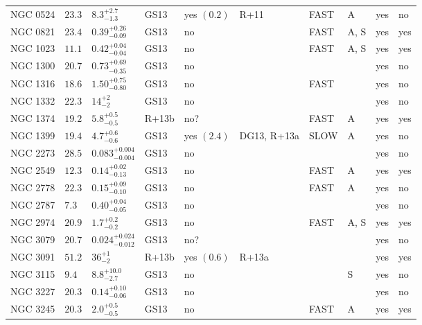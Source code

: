 \begin{table*}
\begin{center}
\begin{tabular}{llllllllll}
NGC 0524  &  $23.3$  &  $8.3_{-1.3}^{+2.7}$   &  GS13  &  yes  $(0.2)$  &  R+11  &  FAST   &  A  &  yes  &  no  \\ 
NGC 0821  &  $23.4$  &  $0.39_{-0.09}^{+0.26}$   &  GS13  &  no   &     &  FAST   &  A, S  &  yes  &  yes  \\ 
NGC 1023  &  $11.1$  &  $0.42_{-0.04}^{+0.04}$   &  GS13  &  no   &     &  FAST   &  A, S  &  yes  &  yes  \\ 
NGC 1300  &  $20.7$  &  $0.73_{-0.35}^{+0.69}$   &  GS13  &  no   &     &      &     &  yes  &  no  \\ 
NGC 1316  &  $18.6$  &  $1.50_{-0.80}^{+0.75}$   &  GS13  &  no   &     &  FAST   &     &  yes  &  no  \\ 
NGC 1332  &  $22.3$  &  $14_{-2}^{+2}$   &  GS13  &  no   &     &      &     &  yes  &  no  \\ 
NGC 1374  &  $19.2$  &  $5.8_{-0.5}^{+0.5}$   &  R+13b  &  no?  &     &  FAST   &  A  &  yes  &  yes  \\ 
NGC 1399  &  $19.4$  &  $4.7_{-0.6}^{+0.6}$   &  GS13  &  yes  $(2.4)$  &  DG13, R+13a  &   SLOW  &  A  &  yes  &  no  \\ 
NGC 2273  &  $28.5$  &  $0.083_{-0.004}^{+0.004}$   &  GS13  &  no   &     &      &     &  yes  &  no  \\ 
NGC 2549  &  $12.3$  &  $0.14_{-0.13}^{+0.02}$   &  GS13  &  no   &     &  FAST   &  A  &  yes  &  yes  \\ 
NGC 2778  &  $22.3$  &  $0.15_{-0.10}^{+0.09}$   &  GS13  &  no   &     &  FAST   &  A  &  yes  &  no  \\ 
NGC 2787  &  $7.3$  &  $0.40_{-0.05}^{+0.04}$   &  GS13  &  no   &     &      &     &  yes  &  no  \\ 
NGC 2974  &  $20.9$  &  $1.7_{-0.2}^{+0.2}$   &  GS13  &  no   &     &  FAST   &  A, S  &  yes  &  yes  \\ 
NGC 3079  &  $20.7$  &  $0.024_{-0.012}^{+0.024}$   &  GS13  &  no?  &     &      &     &  yes  &  no  \\ 
NGC 3091  &  $51.2$  &  $36_{-2}^{+1}$   &  R+13b  &  yes  $(0.6)$  &  R+13a  &      &     &  yes  &  yes  \\ 
NGC 3115  &  $9.4$  &  $8.8_{-2.7}^{+10.0}$   &  GS13  &  no   &     &      & S    &  yes  &  no  \\ 
NGC 3227  &  $20.3$  &  $0.14_{-0.06}^{+0.10}$   &  GS13  &  no   &     &      &     &  yes  &  no  \\ 
NGC 3245  &  $20.3$  &  $2.0_{-0.5}^{+0.5}$   &  GS13  &  no   &     &  FAST   &  A  &  yes  &  yes  \\ 

\end{tabular}
\end{center}
\end{table*}
